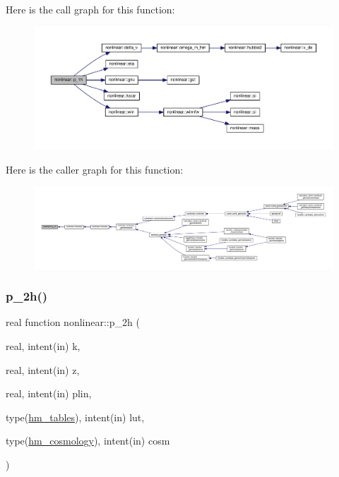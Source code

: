 Here is the call graph for this function\+:
\nopagebreak
\begin{figure}[H]
\begin{center}
\leavevmode
\includegraphics[width=350pt]{namespacenonlinear_a6734815086cf4dca34d8677f1d763e3f_cgraph}
\end{center}
\end{figure}
Here is the caller graph for this function\+:
\nopagebreak
\begin{figure}[H]
\begin{center}
\leavevmode
\includegraphics[width=350pt]{namespacenonlinear_a6734815086cf4dca34d8677f1d763e3f_icgraph}
\end{center}
\end{figure}
\mbox{\label{namespacenonlinear_adbb028d781be22805e7c1468b4e795a8}} 
\subsubsection{\texorpdfstring{p\+\_\+2h()}{p\_2h()}}
{\footnotesize\ttfamily real function nonlinear\+::p\+\_\+2h (\begin{DoxyParamCaption}\item[{real, intent(in)}]{k,  }\item[{real, intent(in)}]{z,  }\item[{real, intent(in)}]{plin,  }\item[{type(\mbox{\hyperlink{structnonlinear_1_1hm__tables}{hm\+\_\+tables}}), intent(in)}]{lut,  }\item[{type(\mbox{\hyperlink{structnonlinear_1_1hm__cosmology}{hm\+\_\+cosmology}}), intent(in)}]{cosm }\end{DoxyParamCaption})\hspace{0.3cm}{\ttfamily [private]}}



